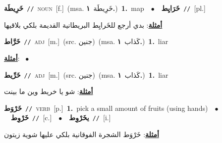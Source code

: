 \documentclass[10pt,a4paper,twoside]{article} %
\begin{document}
\begin{multicols}{2}
{\setlength\topsep{0pt}\textbf{\foreignlanguage{arabic}{خَرِيطَة}}\ {\color{gray}\texttt{//}\color{black}}\ \textsc{noun}\ [f.]\ \color{gray}(msa. \foreignlanguage{arabic}{خَرِيطَة}~\foreignlanguage{arabic}{\textbf{١.}})\color{black}\ \textbf{1.}~map\ \ $\bullet$\ \ \setlength\topsep{0pt}\textbf{\foreignlanguage{arabic}{خَرَايِط}}\ {\color{gray}\texttt{//}\color{black}}\ [pl.]\  \begin{flushright}\color{gray}\foreignlanguage{arabic}{\textbf{\underline{\foreignlanguage{arabic}{أمثلة}}}: بدي أرجع للخَرايِط البريطانية القديمة بلكي بلاقيها}\end{flushright}\color{black}} \vspace{2mm}

{\setlength\topsep{0pt}\textbf{\foreignlanguage{arabic}{خَرَّاط}}\ {\color{gray}\texttt{//}\color{black}}\ \textsc{adj}\ [m.]\ (src. \color{gray}\foreignlanguage{arabic}{جنين}\color{black})\ \color{gray}(msa. \foreignlanguage{arabic}{كَذاب}~\foreignlanguage{arabic}{\textbf{١.}})\color{black}\ \textbf{1.}~liar\  \begin{flushright}\color{gray}\foreignlanguage{arabic}{\textbf{\underline{\foreignlanguage{arabic}{أمثلة}}}: \ $\bullet$\ \  }\end{flushright}\color{black}} \vspace{2mm}

{\setlength\topsep{0pt}\textbf{\foreignlanguage{arabic}{خَرِّيط}}\ {\color{gray}\texttt{//}\color{black}}\ \textsc{adj}\ [m.]\ (src. \color{gray}\foreignlanguage{arabic}{جنين}\color{black})\ \color{gray}(msa. \foreignlanguage{arabic}{كَذاب}~\foreignlanguage{arabic}{\textbf{١.}})\color{black}\ \textbf{1.}~liar\  \begin{flushright}\color{gray}\foreignlanguage{arabic}{\textbf{\underline{\foreignlanguage{arabic}{أمثلة}}}: شو يا خريط وين ما بينت}\end{flushright}\color{black}} \vspace{2mm}

{\setlength\topsep{0pt}\textbf{\foreignlanguage{arabic}{خَرْوَط}}\ {\color{gray}\texttt{//}\color{black}}\ \textsc{verb}\ [p.]\ \textbf{1.}~pick a small amount of fruits (using hands)\ \ $\bullet$\ \ \setlength\topsep{0pt}\textbf{\foreignlanguage{arabic}{خَرْوِط}}\ {\color{gray}\texttt{//}\color{black}}\ [c.]\ \ $\bullet$\ \ \setlength\topsep{0pt}\textbf{\foreignlanguage{arabic}{يخَرْوِط}}\ {\color{gray}\texttt{//}\color{black}}\ [i.]\  \begin{flushright}\color{gray}\foreignlanguage{arabic}{\textbf{\underline{\foreignlanguage{arabic}{أمثلة}}}: خَرْوَط الشجرة الفوقانية بلكي عليها شوية زيتون}\end{flushright}\color{black}} \vspace{2mm}


\end{multicols}
\end{document}
